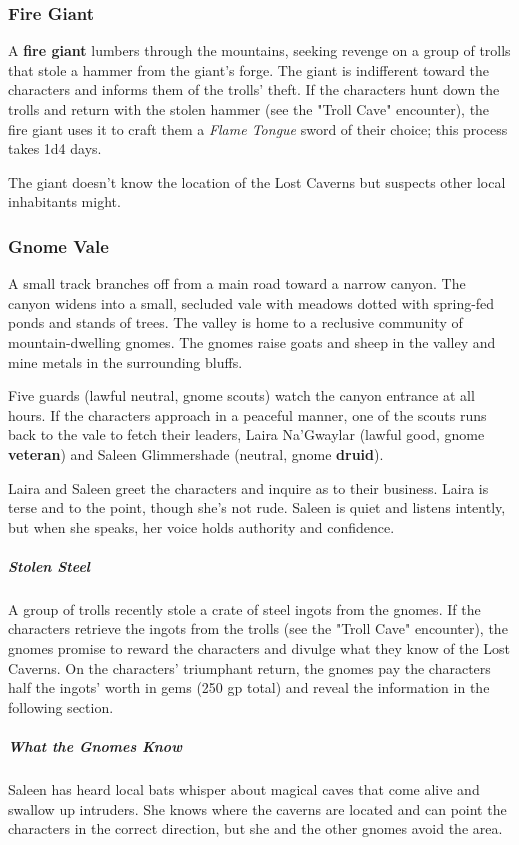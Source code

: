 \documentclass[10pt,a4paper,twoside,bg=print,twocolumn,openany,nodeprecatedcode]{dndbook}
\begin{document}
\subsubsection{Fire Giant}
A \textbf{fire giant} lumbers through the mountains, seeking revenge on a group of trolls that stole a hammer from the giant's forge. The giant is indifferent toward the characters and informs them of the trolls' theft. If the characters hunt down the trolls and return with the stolen hammer (see the "Troll Cave" encounter), the fire giant uses it to craft them a \textit{Flame Tongue} sword of their choice; this process takes 1d4 days.

The giant doesn't know the location of the Lost Caverns but suspects other local inhabitants might.

\subsubsection{Gnome Vale}
A small track branches off from a main road toward a narrow canyon. The canyon widens into a small, secluded vale with meadows dotted with spring-fed ponds and stands of trees. The valley is home to a reclusive community of mountain-dwelling gnomes. The gnomes raise goats and sheep in the valley and mine metals in the surrounding bluffs.

Five guards (lawful neutral, gnome scouts) watch the canyon entrance at all hours. If the characters approach in a peaceful manner, one of the scouts runs back to the vale to fetch their leaders, Laira Na'Gwaylar (lawful good, gnome \textbf{veteran}) and Saleen Glimmershade (neutral, gnome \textbf{druid}).

Laira and Saleen greet the characters and inquire as to their business. Laira is terse and to the point, though she's not rude. Saleen is quiet and listens intently, but when she speaks, her voice holds authority and confidence.

\subparagraph{Stolen Steel}
A group of trolls recently stole a crate of steel ingots from the gnomes. If the characters retrieve the ingots from the trolls (see the "Troll Cave" encounter), the gnomes promise to reward the characters and divulge what they know of the Lost Caverns. On the characters' triumphant return, the gnomes pay the characters half the ingots' worth in gems (250 gp total) and reveal the information in the following section.

\subparagraph{What the Gnomes Know}
Saleen has heard local bats whisper about magical caves that come alive and swallow up intruders. She knows where the caverns are located and can point the characters in the correct direction, but she and the other gnomes avoid the area.
\end{document}
